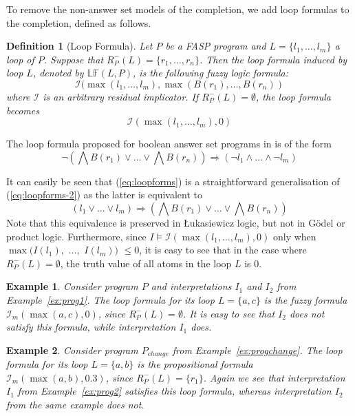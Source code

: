 \documentclass{tlp}
\newcommand{\body}[1]{\ensuremath{B(#1)}}
\newcommand{\nonlooprules}[2]{R^{-}_{#1}(#2)}
\newcommand{\loopform}[2]{\mathbb{LF}(#1,#2)}
\newcommand{\prefimp}{\mathcal{I}}
\newtheorem{definition}{Definition}
\newtheorem{example}{Example}
\newcommand{\imp}{\Rightarrow}
\begin{document}
To remove the non-answer set models of the completion, we add loop formulas to the completion, defined as follows.

\begin{definition}[Loop Formula]\label{def:loopformula}
 Let $P$ be a FASP program and $L = \{ l_1,\ldots,l_m \}$ a loop of $P$. Suppose that $\nonlooprules{P}{L} = \{ r_1,\ldots,r_n \}$. Then the loop formula induced by loop $L$, denoted by $\loopform{L}{P}$, is the following fuzzy logic formula:
  \begin{equation}\prefimp(\max(l_1,\ldots,l_m),\max(\body{r_1},\ldots,\body{r_n})\label{eq:loopforms}\end{equation}
 where $\prefimp$ is an arbitrary residual implicator. If $\nonlooprules{P}{L} = \emptyset$, the loop formula becomes
  $$\prefimp(\max(l_1,\ldots,l_m),0)$$
\end{definition}

 The loop formula proposed for boolean answer set programs in \cite{assat-linzhao} is of the form
  \begin{equation}\neg(\bigwedge \body{r_{1}} \vee \ldots \vee \bigwedge \body{r_{n}} ) \imp (\neg l_1 \wedge \ldots \wedge \neg l_m)\label{eq:loopforms-2}\end{equation}
  
It can easily be seen that (\ref{eq:loopforms}) is a straightforward generalisation of (\ref{eq:loopforms-2}) as the latter is equivalent to
 $$(l_1 \vee \ldots \vee l_m) \imp (\bigwedge \body{r_{1}} \vee \ldots \vee \bigwedge \body{r_{n}})$$
Note that this equivalence is preserved in \L ukasiewicz logic, but not in G\"odel or product logic.
 Furthermore, since $I \models \prefimp(\max(l_1,\ldots,l_m),0)$ only when $\max(I(l_1),$ $\ldots,$ $I(l_m))$ $\leq 0$, it is easy to see that in the case where $\nonlooprules{P}{L} = \emptyset$, the truth value of all atoms in the loop $L$ is $0$.
 
\begin{example}
 Consider program $P$ and interpretations $I_1$ and $I_2$ from Example~\ref{ex:prog1}. The loop formula for its loop $L = \{ a,c \}$ is the fuzzy formula $\prefimp_m(\max(a,c),0)$, since $\nonlooprules{P}{L} = \emptyset$. It is easy to see that $I_{2}$ does not satisfy this formula, while interpretation $I_{1}$ does. 
\end{example}

\begin{example}
 Consider program $P_{change}$ from Example~\ref{ex:progchange}. The loop formula for its loop $L = \{ a,b \}$ is the propositional formula $\prefimp_m(\max(a,b),0.3)$, since $\nonlooprules{P}{L} = \{ r_{1} \}$. Again we see that interpretation $I_{1}$ from Example~\ref{ex:prog2} satisfies this loop formula, whereas interpretation $I_{2}$ from the same example does not.
\end{example}
 
\end{document}
